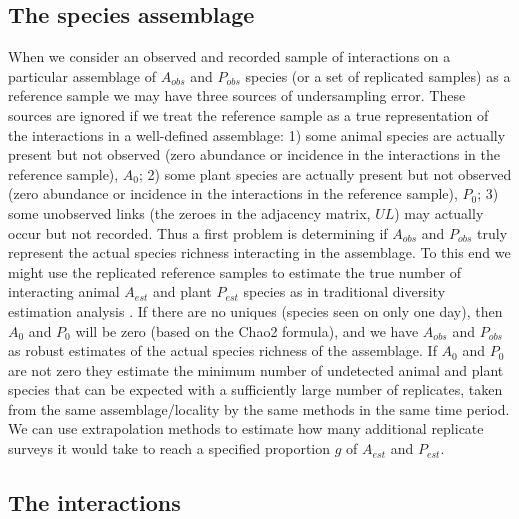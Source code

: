 \documentclass[12pt]{article}
\begin{document}
\subsection*{The species assemblage}

When we consider an observed and recorded sample of interactions on a particular assemblage of $A_{obs}$ and $P_{obs}$ species (or a set of replicated samples) as a reference sample \citep{Chao:2014wm} we may have three sources of undersampling error. These sources are ignored if we treat the reference sample as a true representation of the interactions in a well-defined assemblage: 1) some animal species are actually present but not observed (zero abundance or incidence in the interactions in the reference sample), $A_0$; 2) some plant species are actually present but not observed (zero abundance or incidence in the interactions in the reference sample), $P_0$; 3) some unobserved links (the zeroes in the adjacency matrix, $UL$) may actually occur but not recorded. Thus a first problem is determining if $A_{obs}$ and $P_{obs}$ truly represent the actual species richness interacting in the assemblage. To this end we might use the replicated reference samples to estimate the true number of interacting animal $A_{est}$ and plant $P_{est}$ species as in traditional diversity estimation analysis \citep{Chao:2014wm}.  If there are no uniques (species seen on only one day), then $A_0$ and $P_0$ will be zero (based on the Chao2 formula), and we have $A_{obs}$ and $P_{obs}$ as robust estimates of the actual species richness of the assemblage. If $A_0$ and $P_0$ are not zero they estimate the minimum number of undetected animal and plant species that can be expected with a sufficiently large number of replicates, taken from the same assemblage/locality by the same methods in the same time period. We can use extrapolation methods \citep{Colwell:2012fc} to estimate how many additional replicate surveys it would take to reach a specified proportion $g$ of $A_{est}$ and $P_{est}$.


\subsection*{The interactions}
\end{document}
